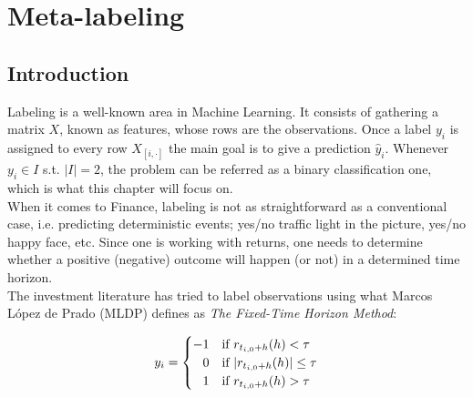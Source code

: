 \documentclass[a4paper]{report}
\begin{document}






\null
\thispagestyle{empty}
\addtocounter{page}{-3}
\newpage

\cleardoublepage
{}
\tableofcontents
\cleardoublepage
{}





\chapter{Meta-labeling}
\label{chapterMetaLabeling}

\section{Introduction}
\label{sec:intro}
Labeling is a well-known area in Machine Learning. It consists of gathering 
a matrix $X$, known as features, whose rows are the observations. Once a 
label $y_i$ is assigned to every row $X_{[i,\cdot]}$ the main goal is to give 
a prediction $\widehat{y}_i$. Whenever $y_i \in I$ s.t. $|I| = 2$, the 
problem can be referred as a binary classification one, which is what this 
chapter will focus on.\\

When it comes to Finance, labeling is not as straightforward as a 
conventional case, i.e. predicting deterministic events; yes/no traffic 
light in the picture, yes/no happy face, etc. Since one is working with 
returns, one needs to determine whether a positive (negative) outcome will 
happen (or not) in a determined time horizon.\\

The investment literature has tried to label observations using what Marcos 
López de Prado (MLDP) \cite{AdvFML} defines as \textit{The Fixed-Time 
Horizon Method}:

\begin{equation}
	y_i =
    \begin{cases}
      -1 & \text{if}\ r_{t_{i, 0} + h}(h) < \tau \\
      \hfill 0 & \text{if}\ |r_{t_{i, 0} + h}(h)| \leq \tau \\
      \hfill 1 & \text{if}\ r_{t_{i, 0} + h}(h) > \tau
    \end{cases}
\end{equation}
\end{document}

